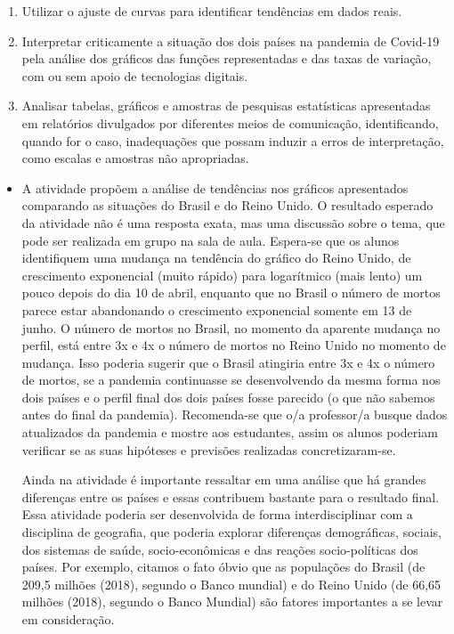 \documentclass[10 pt,usenames,dvipsnames, oneside]{article}
\begin{document}
\begin{goals}
\begin{enumerate}
\item Utilizar o ajuste de curvas para identificar tendências em dados reais.
\item Interpretar criticamente a situação dos dois países na pandemia de Covid-19 pela análise dos gráficos das funções representadas e das taxas de variação, com ou sem apoio de tecnologias digitais.
\item Analisar tabelas, gráficos e amostras de pesquisas estatísticas apresentadas em relatórios divulgados por diferentes meios de comunicação, identificando, quando for o caso, inadequações que possam induzir a erros de interpretação, como escalas e amostras não apropriadas.
\end{enumerate}

\tcblower

\begin{itemize}
\item A atividade propõem a análise de tendências nos gráficos apresentados comparando as situações do Brasil e do Reino Unido. O resultado esperado da atividade não é uma resposta exata, mas uma discussão sobre o tema, que pode ser realizada em grupo na sala de aula. Espera-se que os alunos identifiquem uma mudança na tendência do gráfico do Reino Unido, de crescimento exponencial (muito rápido) para logarítmico (mais lento) um pouco depois do dia 10 de abril, enquanto que no Brasil o número de mortos parece estar abandonando o crescimento exponencial somente em 13 de junho. O número de mortos no Brasil, no momento da aparente mudança no perfil, está entre 3x e 4x o número de mortos no Reino Unido no momento de mudança. Isso poderia sugerir que o Brasil atingiria entre 3x e 4x o número de mortos, se a pandemia continuasse se  desenvolvendo da mesma forma nos dois países e o perfil final dos dois países fosse parecido (o que não sabemos antes do final da pandemia). Recomenda-se que o/a professor/a busque dados atualizados da pandemia e mostre aos estudantes, assim os alunos poderiam verificar se as suas hipóteses e previsões realizadas concretizaram-se.

	Ainda na atividade é importante ressaltar em uma análise que há grandes diferenças entre os países e essas contribuem bastante para o resultado final. Essa atividade poderia ser desenvolvida de forma interdisciplinar com a disciplina de geografia, que poderia explorar diferenças demográficas, sociais, dos sistemas de saúde, socio-econômicas e das reações socio-políticas dos países. Por exemplo, citamos o fato óbvio que as populações do Brasil (de 209,5 milhões (2018), segundo o Banco mundial) e do Reino Unido (de 66,65 milhões (2018), segundo o Banco Mundial) são fatores importantes a se levar em consideração.
\end{itemize}
\end{goals}
\end{document}
